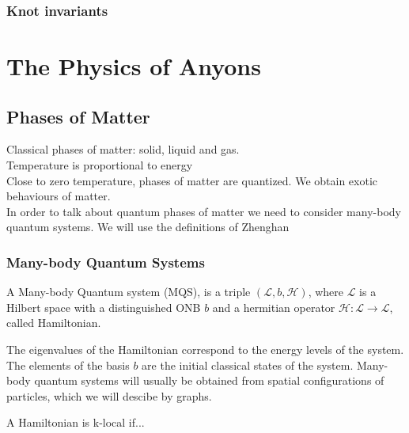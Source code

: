 \documentclass{article}
\newenvironment{definition}[1][Definition]{\begin{trivlist}
\item[\hskip \labelsep {\bfseries #1}]}{\end{trivlist}}
\begin{document}
\subsubsection{Knot invariants}


\section{The Physics of Anyons}


\subsection{Phases of Matter}
Classical phases of matter: solid, liquid and gas.\\
Temperature is proportional to energy \\
Close to zero temperature, phases of matter are quantized. We obtain exotic behaviours of matter.\\
In order to talk about quantum phases of matter we need to consider many-body quantum systems. We will use the definitions of Zhenghan

\subsubsection{Many-body Quantum Systems}
\begin{definition}
A Many-body Quantum system (MQS), is a triple $(\mathcal{L}, b, \mathcal{H})$, where $\mathcal{L}$ is a Hilbert space with a distinguished ONB $b$ and a hermitian operator $\mathcal{H}: \mathcal{L} \rightarrow \mathcal{L}$, called Hamiltonian.
\end{definition}
The eigenvalues of the Hamiltonian correspond to the energy levels of the system. The elements of the basis $b$ are the initial classical states of the system. Many-body quantum systems will usually be obtained from spatial configurations of particles, which we will descibe by graphs.
\begin{definition}
A Hamiltonian is k-local if...
\end{definition}
\end{document}
